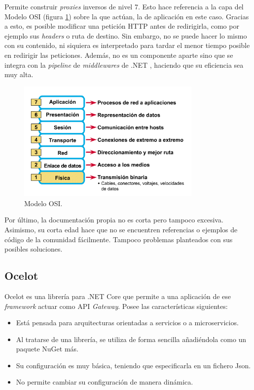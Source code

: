 \documentclass[11pt,spanish,listoffigures]{tfgetsinf}
\begin{document}
Permite construir \emph{proxies} inversos de nivel 7. Esto hace referencia a la capa del Modelo OSI (figura \ref{modeloOSI}) sobre la que actúan, la de aplicación en este caso. Gracias a esto, es posible modificar una petición HTTP antes de redirigirla, como por ejemplo sus \emph{headers} o ruta de destino. Sin embargo, no se puede hacer lo mismo con su contenido, ni siquiera es interpretado para tardar el menor tiempo posible en redirigir las peticiones. Además, no es un componente aparte sino que se integra con la \emph{pipeline} de \emph{middlewares} de .NET \cite{MiddlewaresPipeline}, haciendo que su eficiencia sea muy alta.

\begin{figure}[ht]
\centering
\includegraphics[width=0.8\textwidth]{imagenes/modeloOSI}
\caption{Modelo OSI.}
	\label{modeloOSI}
\end{figure}

Por último, la documentación propia no es corta pero tampoco excesiva. Asimismo, su corta edad hace que no se encuentren referencias o ejemplos de código de la comunidad fácilmente. Tampoco problemas planteados con sus posibles soluciones.


		\subsection{Ocelot}
		
Ocelot \cite{Ocelot} es una librería para .NET Core que permite a una aplicación de ese \emph{framework} actuar como API \emph{Gateway}. Posee las características siguientes:

\begin{itemize}

	\item Está pensada para arquitecturas orientadas a servicios o a microservicios.
	
	\item Al tratarse de una librería, se utiliza de forma sencilla añadiéndola como un paquete NuGet más.
	
	\item Su configuración es muy básica, teniendo que especificarla en un fichero Json.
	
	\item No permite cambiar su configuración de manera dinámica.

\end{itemize}
\end{document}

